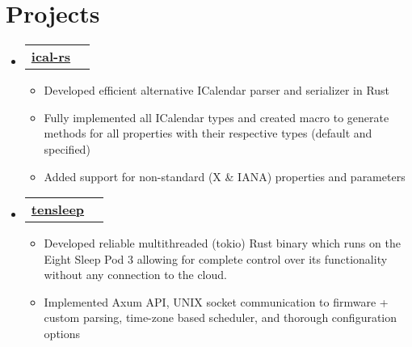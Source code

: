 \documentclass[12pt]{article}
\makeatletter
\newcommand{\entry}[1]{
  \item\small{
    {#1 \vspace{-2pt}}
  }
}
\newcommand{\projectheading}[2]{
  \vspace{-2pt}\item
    \begin{tabular*}{0.97\textwidth}{l@{\extracolsep{\fill}}r}
      \small#1 & #2 \\
    \end{tabular*}\vspace{-7pt}
}
\newcommand{\subheadingliststart}{\begin{itemize}[leftmargin=0.15in, label={}]}
\newcommand{\subheadinglistend}{\end{itemize}}
\newcommand{\entryliststart}{\begin{itemize}}
\newcommand{\entrylistend}{\end{itemize}\vspace{-5pt}}
\makeatother
\begin{document}
\section{Projects}
  \vspace{3pt}
  \subheadingliststart
    \projectheading
      {\textbf{\href{https://github.com/LiamSnow/ical-rs}{ical-rs}}}{}
        \entryliststart
            \entry{Developed efficient alternative ICalendar parser and serializer in Rust}
            \entry{Fully implemented all ICalendar types and created macro to generate methods for all properties with their respective types (default and specified)}
            \entry{Added support for non-standard (X \& IANA) properties and parameters}
        \entrylistend
    \projectheading
      {\textbf{\href{https://github.com/LiamSnow/tensleep}{tensleep}}}{}
        \entryliststart
            \entry{Developed reliable multithreaded (tokio) Rust binary which runs on the Eight Sleep Pod 3 allowing for complete control over its functionality without any connection to the cloud.}
            \entry{Implemented Axum API, UNIX socket communication to firmware + custom parsing, time-zone based scheduler, and thorough configuration options}
        \entrylistend
  \subheadinglistend
\end{document}
